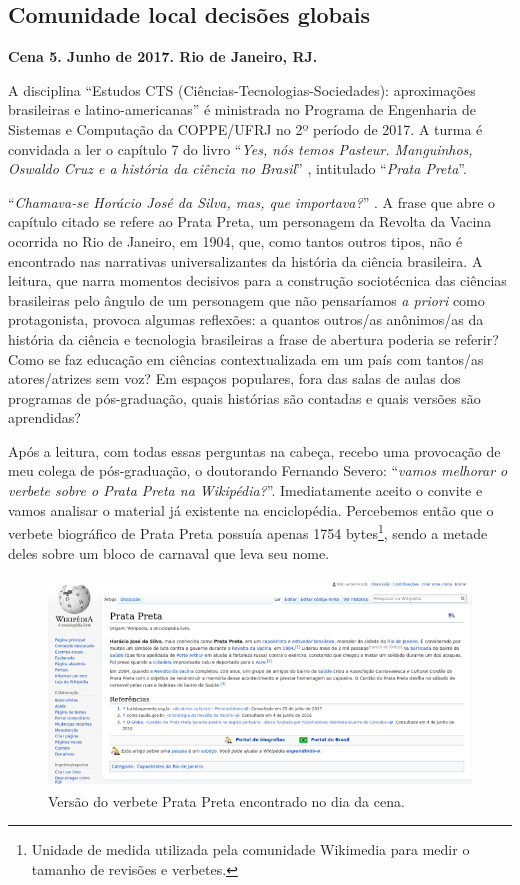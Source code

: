 \subsection{Comunidade local decisões globais }

\textbf{Cena 5. Junho de 2017. Rio de Janeiro, RJ.}

A disciplina ``Estudos CTS (Ciências-Tecnologias-Sociedades): aproximações brasileiras e latino-americanas'' é ministrada no Programa de Engenharia de Sistemas e Computação da COPPE/UFRJ no 2º período de 2017. A turma é convidada a ler o capítulo 7 do livro ``\textit{Yes, nós temos Pasteur. Manguinhos, Oswaldo Cruz e a história da ciência no Brasil}'' \citep{cukierman_pasteur_2007}, intitulado ``\textit{Prata Preta}''.

``\textit{Chamava-se Horácio José da Silva, mas, que importava?}'' \citep[p. 220]{cukierman_pasteur_2007}. A frase que abre o capítulo citado se refere ao Prata Preta, um personagem da Revolta da Vacina ocorrida no Rio de Janeiro, em 1904, que, como tantos outros tipos, não é encontrado nas narrativas universalizantes da história da ciência brasileira. A leitura, que narra momentos decisivos para a construção sociotécnica das ciências brasileiras pelo ângulo de um personagem que não pensaríamos \textit{a priori} como protagonista, provoca algumas reflexões: a quantos outros/as anônimos/as da história da ciência e tecnologia brasileiras a frase de abertura poderia se referir? Como se faz educação em ciências contextualizada em um país com tantos/as atores/atrizes sem voz? Em espaços populares, fora das salas de aulas dos programas de pós-graduação, quais histórias são contadas e quais versões são aprendidas?

Após a leitura, com todas essas perguntas na cabeça, recebo uma provocação de meu colega de pós-graduação, o doutorando Fernando Severo: ``\textit{vamos melhorar o verbete sobre o Prata Preta na Wikipédia?}''. Imediatamente aceito o convite e vamos analisar o material já existente na enciclopédia. Percebemos então que o verbete biográfico de Prata Preta possuía apenas 1754 bytes\footnote{Unidade de medida utilizada pela comunidade Wikimedia para medir o tamanho de revisões e verbetes.}, sendo a metade deles sobre um bloco de carnaval que leva seu nome.

\begin{figure}[H]
    \centering
    \includegraphics[width=1\textwidth]{Images/pratapreta.png}
    \caption{Versão do verbete Prata Preta encontrado no dia da cena.}
    \label{fig:verbete_pratapreta}
\end{figure}

